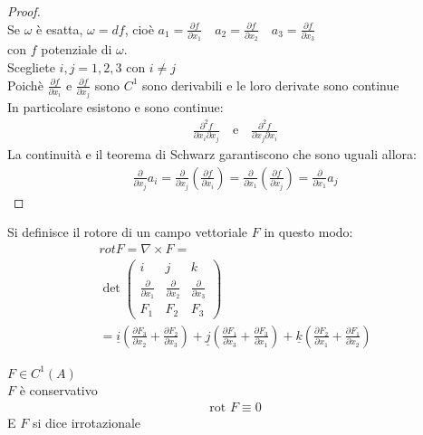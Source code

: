 \documentclass[a4paper, oneside]{article}
\begin{document}
\begin{proof}
    \hfill\\
    Se $\omega$ è esatta, $\omega = d f$, cioè $a_1 = \frac{\partial f}{\partial x_1} \quad a_2 = \frac{\partial f}{\partial x_2} \quad a_3 = \frac{\partial f}{\partial x_3}   $\\
    con $f$ potenziale di $\omega$.\\
    Scegliete $i,j = 1,2,3$ con $i \neq j$\\
    Poichè $\frac{\partial f}{\partial x_i}$ e $\frac{\partial f}{\partial x_j}$ sono $C^1$ sono derivabili e le loro derivate sono continue\\
    In particolare esistono e sono continue:
    \begin{gather*}
        \frac{\partial^2 f}{\partial x_i\partial x_j} \quad \text{e} \quad \frac{\partial^2 f}{\partial x_j\partial x_i} 
    \end{gather*}
    La continuità e il teorema di Schwarz garantiscono che sono uguali allora:
    \begin{gather*}
        \frac{\partial}{\partial x_j} a_i = \frac{\partial}{\partial x_j} (\frac{\partial f}{\partial x_i}) = \frac{\partial}{\partial x_1}(\frac{\partial f}{\partial x_j}) = \frac{\partial}{\partial x_1} a_j
    \end{gather*}
\end{proof}


\begin{definition}[Rotore]
    Si definisce il rotore di un campo vettoriale $F$ in questo modo:
    \begin{gather*}
        rot F = \nabla \times F =\\
        \det\begin{pmatrix}
            i & j & k\\
            \frac{\partial}{\partial x_1} & \frac{\partial}{\partial x_2} & \frac{\partial}{\partial x_3}\\
            F_1 & F_2 & F_3
        \end{pmatrix}\\
        = \underline{i} (\frac{\partial F_3}{\partial x_2} + \frac{\partial F_2}{\partial x_3}) + \underline{j} (\frac{\partial F_1}{\partial x_3} + \frac{\partial F_3}{\partial x_1}) + \underline{k} (\frac{\partial F_2}{\partial x_1} + \frac{\partial F_1}{\partial x_2})
    \end{gather*}
\end{definition}


\begin{theorem}
     $F \in C^1(A)$\\
     $F$ è conservativo \\
    \begin{gather*}
        \text{rot } F \equiv 0
    \end{gather*}
    E $F$ si dice irrotazionale
\end{theorem}
\end{document}

